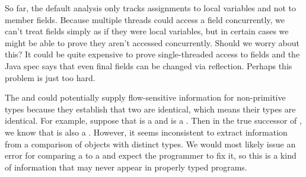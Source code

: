 \begin{workinprogress}
So far, the default analysis only tracks assignments to local variables and not to member
fields.  Because multiple threads could access a field concurrently, we can't treat fields
simply as if they were local variables, but in certain cases we might be able to prove 
they aren't accessed concurrently.  Should we worry about this?  It could be quite expensive 
to prove single-threaded access to fields and the Java spec says that even final fields can be
changed via reflection.  Perhaps this problem is just too hard.

The  and  could potentially supply flow-sensitive
information for 
non-primitive types because they establish that two  are identical, which means their 
types are identical.  For example, suppose that  is a  and  is 
a .  Then
in the true successor of , we know that  is also a 
.  However, it 
seems inconsistent to extract information from a comparison of objects with distinct types.  
We would most likely issue an error for comparing a  to a 
and expect the
programmer to fix it, so this is a kind of information that may never appear in properly typed
programs.
\end{workinprogress}

















